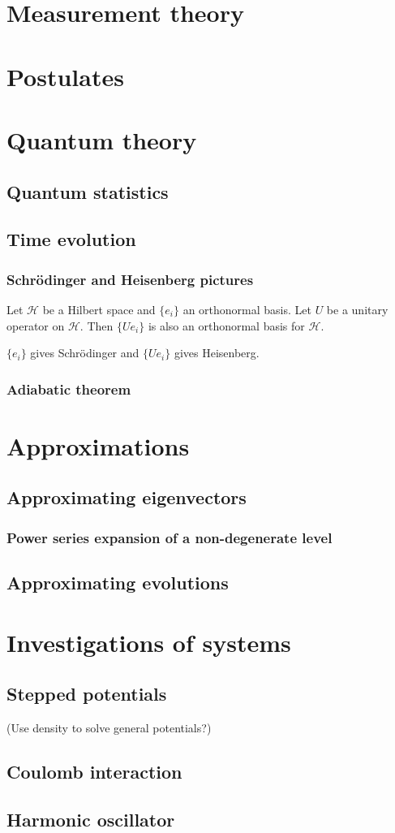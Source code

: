 \chapter{Measurement theory}

\chapter{Postulates}

\chapter{Quantum theory}
\section{Quantum statistics}

\section{Time evolution}
\subsection{Schrödinger and Heisenberg pictures}
\begin{lemma}
Let $\mathcal{H}$ be a Hilbert space and $\{e_i\}$ an orthonormal basis. Let $U$ be a unitary operator on $\mathcal{H}$. Then $\{Ue_i\}$ is also an orthonormal basis for $\mathcal{H}$.
\end{lemma}
$\{e_i\}$ gives Schrödinger and $\{Ue_i\}$ gives Heisenberg.



\subsection{Adiabatic theorem}

\chapter{Approximations}
\section{Approximating eigenvectors}
\subsection{Power series expansion of a non-degenerate level}

\section{Approximating evolutions}

\chapter{Investigations of systems}
\section{Stepped potentials}
(Use density to solve general potentials?)
\section{Coulomb interaction}
\section{Harmonic oscillator}